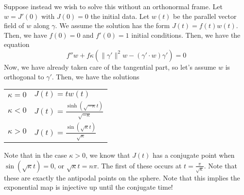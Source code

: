 \documentclass[../main.tex]{subfiles}
\begin{document}
Suppose instead we wish to solve this without an orthonormal frame. Let $w =
J'(0)$ with $J(0)=0$ the initial data. Let $w(t)$ be the parallel vector field
of $w$ along $\gamma$. We assume the solution has the form $J(t) = f(t)w(t)$.
Then, we have
$f(0) = 0$ and $f'(0)=1$ initial conditions. Then, we have the equation
\begin{equation}
    f''w + f\kappa(\|\gamma'\|^2w - (\gamma'\cdot w)\gamma')=0
\end{equation}
Now, we have already taken care of the tangential part, so let's assume $w$ is
orthogonal to $\gamma'$. Then, we have the solutions
\begin{table}
    \centering
    \begin{tabular}{l l}
        $\kappa=0$ & $J(t) = tw(t)$\\
    $\kappa<0$ & $J(t) = \frac{\sinh(\sqrt{-\kappa} t)}{\sqrt{-\kappa}}$\\
    $\kappa>0$ & $J(t) = \frac{\sin(\sqrt{\kappa}t)}{\sqrt{\kappa}}$\\
    \end{tabular}
\end{table}

Note that in the case $\kappa > 0$, we know that $J(t)$ has a conjugate point
when $\sin(\sqrt{\kappa}t) = 0$, or $\sqrt{\kappa}t = n\pi$. The first of these
occurs at $t = \frac{\pi}{\sqrt{\kappa}}$. Note that these are exactly the
antipodal points on the sphere. Note that this implies the exponential map is
injective up until the conjugate time!
\end{document}
